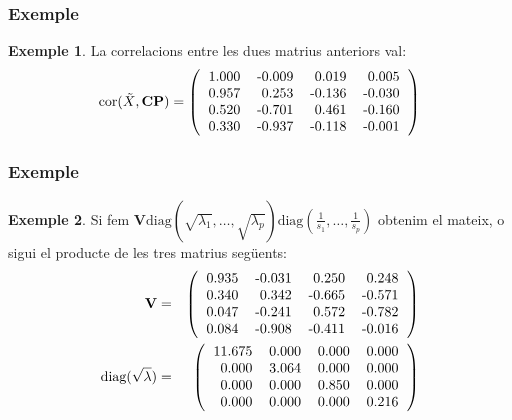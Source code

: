 \documentclass[12pt,t]{beamer}
\theoremstyle{plain}
\theoremstyle{definition}
\newtheorem{exemple}{Exemple}
\begin{document}
\begin{frame}
\frametitle{Exemple}
\begin{exemple}
La correlacions entre les dues matrius anteriors val:
\[
\mbox{cor}(\tilde{X},{\mathbf{CP}})=\left(
\begin{tabular}{rrrr}
  1.000 & -0.009 & 0.019 & 0.005 \\ 
  0.957 & 0.253 & -0.136 & -0.030 \\ 
  0.520 & -0.701 & 0.461 & -0.160 \\ 
  0.330 & -0.937 & -0.118 & -0.001 \\ 
  \end{tabular}\right)
\]

\end{exemple}
\end{frame}

\begin{frame}
\frametitle{Exemple}
\begin{exemple}
Si fem $\mathbf{V}\mbox{diag}(\sqrt{\lambda_1},\ldots,\sqrt{\lambda_p})\mbox{diag}\left(\frac{1}{s_1},\ldots,\frac{1}{s_p}\right)$ obtenim el mateix, o sigui el producte de les tres matrius següents:
\begin{eqnarray*}
\mathbf{V} &=&\left(
\begin{tabular}{rrrr}
  0.935 & -0.031 & 0.250 & 0.248 \\ 
  0.340 & 0.342 & -0.665 & -0.571 \\ 
  0.047 & -0.241 & 0.572 & -0.782 \\ 
  0.084 & -0.908 & -0.411 & -0.016 \\ 
  \end{tabular}\right)\\
\mbox{diag}(\sqrt{\lambda}) &=&\left(
\begin{tabular}{rrrr}
  11.675 & 0.000 & 0.000 & 0.000 \\ 
  0.000 & 3.064 & 0.000 & 0.000 \\ 
  0.000 & 0.000 & 0.850 & 0.000 \\ 
  0.000 & 0.000 & 0.000 & 0.216 \\ 
  \end{tabular}\right)
\end{eqnarray*}


\end{exemple}
\end{frame}
\end{document}
